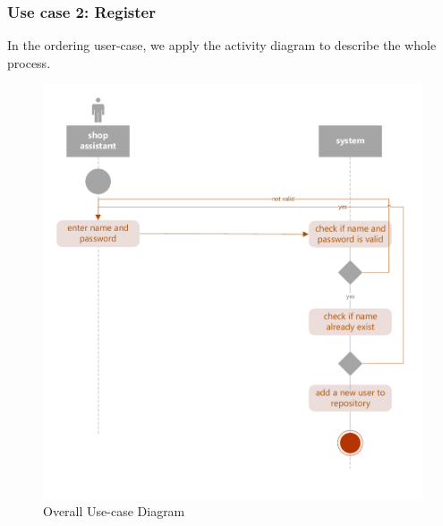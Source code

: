 \documentclass[a4paper]{report}
\begin{document}
\subsubsection{Use case 2: Register}
In the ordering user-case, we apply the activity diagram to describe the whole process. 
\begin{figure}
  \centering
  \includegraphics[scale=0.44]{ActivityDiagram.pdf}
  \caption{Overall Use-case Diagram}\label{3}
\end{figure}
\end{document}
